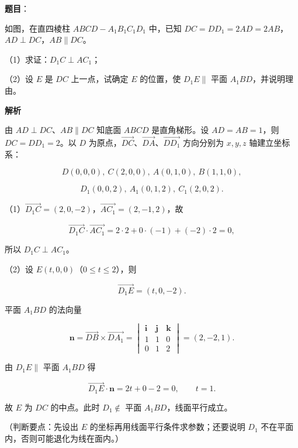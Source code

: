 \begin{answer}

\textbf{题目}：

如图，在直四棱柱 $ABCD-A_1B_1C_1D_1$ 中，已知 $DC=DD_1=2AD=2AB$，$AD\perp DC$，$AB\parallel DC$。

（1）求证：$D_1C\perp AC_1$；

（2）设 $E$ 是 $DC$ 上一点，试确定 $E$ 的位置，使 $D_1E\parallel$ 平面 $A_1BD$，并说明理由。
\nopagebreak[4]
\begin{center}\end{center}
\nopagebreak[4]
\textbf{解析}

由 $AD\perp DC$、$AB\parallel DC$ 知底面 $ABCD$ 是直角梯形。设 $AD=AB=1$，则 $DC=DD_1=2$。以 $D$ 为原点，$\overrightarrow{DC}$、$\overrightarrow{DA}$、$\overrightarrow{DD_1}$ 方向分别为 $x,y,z$ 轴建立坐标系：

\nopagebreak[4]
\[D(0,0,0),\ C(2,0,0),\ A(0,1,0),\ B(1,1,0),\]

\nopagebreak[4]
\[D_1(0,0,2),\ A_1(0,1,2),\ C_1(2,0,2).\]

（1）$\overrightarrow{D_1C}=(2,0,-2)$，$\overrightarrow{AC_1}=(2,-1,2)$，故

\nopagebreak[4]
\[\overrightarrow{D_1C}\cdot\overrightarrow{AC_1}=2\cdot2+0\cdot(-1)+(-2)\cdot2=0,\]

所以 $D_1C\perp AC_1$。

（2）设 $E(t,0,0)$（$0\leqslant t\leqslant2$），则

\nopagebreak[4]
\[\overrightarrow{D_1E}=(t,0,-2).\]

平面 $A_1BD$ 的法向量

\nopagebreak[4]
\[\boldsymbol n=\overrightarrow{DB}\times\overrightarrow{DA_1}=
\begin{vmatrix}
\boldsymbol i&\boldsymbol j&\boldsymbol k\\
1&1&0\\
0&1&2
\end{vmatrix}=(2,-2,1).\]

由 $D_1E\parallel$ 平面 $A_1BD$ 得

\nopagebreak[4]
\[\overrightarrow{D_1E}\cdot\boldsymbol n=2t+0-2=0,\qquad t=1.\]

故 $E$ 为 $DC$ 的中点。此时 $D_1\notin$ 平面 $A_1BD$，线面平行成立。

（判断要点：先设出 $E$ 的坐标再用线面平行条件求参数；还要说明 $D_1$ 不在平面内，否则可能退化为线在面内。）


\end{answer}
